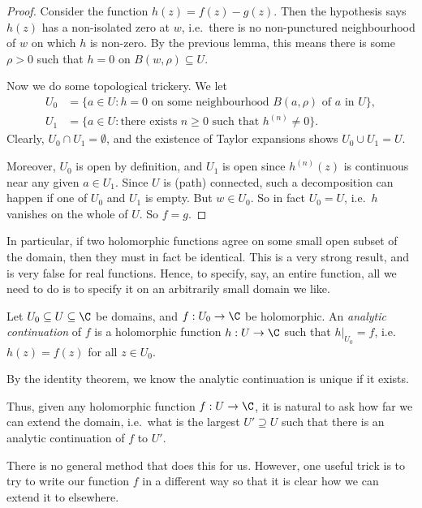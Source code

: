 \documentclass[a4paper]{article}
\begin{document}
\begin{proof}
  Consider the function $h(z) = f(z) - g(z)$. Then the hypothesis says $h(z)$ has a non-isolated zero at $w$, i.e.\ there is no non-punctured neighbourhood of $w$ on which $h$ is non-zero. By the previous lemma, this means there is some $\rho > 0$ such that $h = 0$ on $B(w, \rho) \subseteq U$.

  Now we do some topological trickery. We let
  \begin{align*}
    U_0 &= \{a \in U: h = 0\text{ on some neighbourhood }B(a, \rho)\text{ of }a\text{ in }U\},\\
    U_1 &= \{a \in U: \text{there exists }n \geq 0\text{ such that }h^{(n)} \not= 0\}.
  \end{align*}
  Clearly, $U_0 \cap U_1 = \emptyset$, and the existence of Taylor expansions shows $U_0 \cup U_1 = U$.

  Moreover, $U_0$ is open by definition, and $U_1$ is open since $h^{(n)}(z)$ is continuous near any given $a \in U_1$. Since $U$ is (path) connected, such a decomposition can happen if one of $U_0$ and $U_1$ is empty. But $w \in U_0$. So in fact $U_0 = U$, i.e.\ $h$ vanishes on the whole of $U$. So $f = g$.
\end{proof}

In particular, if two holomorphic functions agree on some small open subset of the domain, then they must in fact be identical. This is a very strong result, and is very false for real functions. Hence, to specify, say, an entire function, all we need to do is to specify it on an arbitrarily small domain we like.

\begin{defi}
  Let $U_0\subseteq U \subseteq \C$ be domains, and $f: U_0 \to \C$ be holomorphic. An \emph{analytic continuation} of $f$ is a holomorphic function $h:U \to \C$ such that $h|_{U_0} = f$, i.e.\ $h(z) = f(z)$ for all $z \in U_0$.
\end{defi}
By the identity theorem, we know the analytic continuation is unique if it exists.

Thus, given any holomorphic function $f: U \to \C$, it is natural to ask how far we can extend the domain, i.e.\ what is the largest $U' \supseteq U$ such that there is an analytic continuation of $f$ to $U'$.

There is no general method that does this for us. However, one useful trick is to try to write our function $f$ in a different way so that it is clear how we can extend it to elsewhere.
\end{document}
